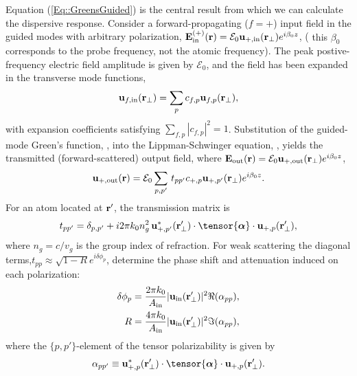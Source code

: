 \documentclass[preprint,aps,pra,onecolumn]{revtex4-1} %
\newcommand{\inp}{{\rm in}}
\newcommand{\out}{{\rm out}}
\newcommand{\change}[1]{{\color{RoyalBlue} #1}}
\newcommand{\comment}[1]{{\color{Maroon} #1}}
\begin{document}
Equation (\ref{Eq::GreensGuided}) is the central result from which we can calculate the dispersive response.  
Consider a forward-propagating ($f=+$) input field in the guided modes with arbitrary polarization, $\mathbf{E}^{(+)}_{\inp}(\br) = \mathcal{E}_0 \mathbf{u}_{+,\rm in}(\br_\perp) e^{i \beta_0 z}$, (\comment{this $\beta_0$ corresponds to the probe frequency, not the atomic frequency}).   The peak postive-frequency electric field amplitude is given by $\mathcal{E}_0$, and the field has been expanded in the transverse mode functions,
	\begin{align}
		\mathbf{u}_{f,\rm in}(\mathbf{r}_\perp) = \sum_{p} c_{f,p} \mathbf{u}_{f,p}(\mathbf{r}_\perp),
	\end{align}
with expansion coefficients satisfying $\sum_{f,p} |c_{f,p}|^2 = 1$.  Substitution of the guided-mode Green's function, , into the Lippman-Schwinger equation, , yields the transmitted (forward-scattered) output field, where $\mathbf{E}_{\out}(\br) = \mathcal{E}_0 \mathbf{u}_{+,\rm out}(\br_\perp) e^{i \beta_0 z}$, 
	\begin{equation}
		\mathbf{u}_{+,\out}(\br) =  \mathcal{E}_0 \sum_{p,p'}  \, t_{pp'} c_{+,p} \mathbf{u}_{+, p'}(\br_\perp) e^{i \beta_0 z}. 
	\end{equation}
For an atom located at $\mathbf{r}'$, the transmission matrix is \change{
\begin{equation} \label{Eq::PolarizationTransformation}
t_{pp'} = \delta_{p,p'} + i 2\pi k_0 n_g^2 \, \mathbf{u}^*_{+, p'}(\br'_\perp) \cdot 
\tensor{\boldsymbol{\alpha}} \cdot \mathbf{u}_{+, p}(\br'_\perp) ,
\end{equation}
where $n_g = c/v_g$ is the group index of refraction.  }  For weak scattering the diagonal terms,$t_{p p} \approx \sqrt{1-R}e^{i \delta \phi_p}$, determine the phase shift and attenuation induced on each polarization:
	\begin{align}
		\delta \phi_p &= \frac{2 \pi k_0}{A_{\rm in}} |\mathbf{u}_{\rm in}(\mathbf{r}'_\perp)|^{2} \Re(\alpha_{pp}) , \label{Eq::PhaseShift} \\
		R &=  \frac{4 \pi k_0}{A_{\rm in}} |\mathbf{u}_{\rm in}(\mathbf{r}'_\perp)|^{2} \Im(\alpha_{pp}) , \label{Eq::Attenuation}
	\end{align}
where the $\{p,p'\}$-element of the tensor polarizability is given by 
	\begin{align}
		\alpha_{pp'} \equiv \mathbf{u}^*_{+,p}(\br'_\perp) \cdot \tensor{\boldsymbol{\alpha}}\cdot \mathbf{u}_{+, p}(\br'_\perp). \label{Eq::ModeAreaImplicit}
	\end{align} 
\end{document}
